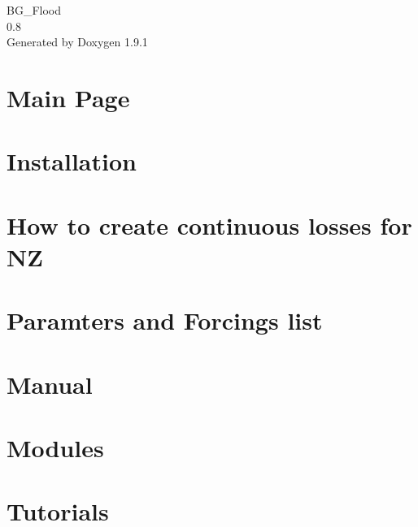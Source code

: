 \let\mypdfximage\pdfximage\def\pdfximage{\immediate\mypdfximage}\documentclass[twoside]{book}
\newcommand{\+}{\discretionary{\mbox{\scriptsize$\hookleftarrow$}}{}{}}
\newcommand{\clearemptydoublepage}{%
  \newpage{\pagestyle{empty}\cleardoublepage}%
}
\begin{document}
\raggedbottom

\hypersetup{pageanchor=false,
             bookmarksnumbered=true,
             pdfencoding=unicode
            }
\begin{titlepage}
\vspace*{7cm}
\begin{center}%
{\Large BG\+\_\+\+Flood \\[1ex]\large 0.\+8 }\\
\vspace*{1cm}
{\large Generated by Doxygen 1.9.1}\\
\end{center}
\end{titlepage}
\clearemptydoublepage
{}
\tableofcontents
\clearemptydoublepage
{}
\hypersetup{pageanchor=true}

\chapter{Main Page}
\label{index}\hypertarget{index}{}
\chapter{Installation}
\label{How_to_install}

\chapter{How to create continuous losses for NZ}
\label{md_doc_modules_NZ_Conductivity}

\chapter{Paramters and Forcings list}
\label{ParameterList}

\chapter{Manual}
\label{Manual}

\chapter{Modules}
\label{Modules}

\chapter{Tutorials}
\label{Tutorials}

\end{document}
